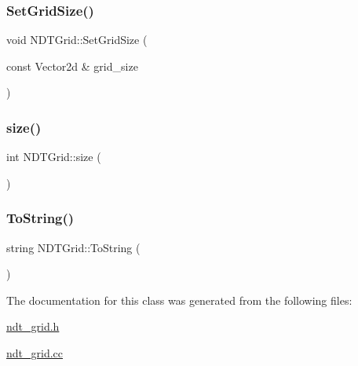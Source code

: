 \subsubsection{\texorpdfstring{Set\+Grid\+Size()}{SetGridSize()}}
{\footnotesize\ttfamily void N\+D\+T\+Grid\+::\+Set\+Grid\+Size (\begin{DoxyParamCaption}\item[{const Vector2d \&}]{grid\+\_\+size }\end{DoxyParamCaption})}

\mbox{\label{classNDTGrid_a8a55fc9ac056847baaff928c8cd5f59a}} 
\subsubsection{\texorpdfstring{size()}{size()}}
{\footnotesize\ttfamily int N\+D\+T\+Grid\+::size (\begin{DoxyParamCaption}{ }\end{DoxyParamCaption})\hspace{0.3cm}{\ttfamily [inline]}}

\mbox{\label{classNDTGrid_a53ab3dca007fddacb4ca09d165eab93d}} 
\subsubsection{\texorpdfstring{To\+String()}{ToString()}}
{\footnotesize\ttfamily string N\+D\+T\+Grid\+::\+To\+String (\begin{DoxyParamCaption}{ }\end{DoxyParamCaption})}



The documentation for this class was generated from the following files\+:\begin{DoxyCompactItemize}
\item 
\hyperlink{ndt__grid_8h}{ndt\+\_\+grid.\+h}\item 
\hyperlink{ndt__grid_8cc}{ndt\+\_\+grid.\+cc}\end{DoxyCompactItemize}
